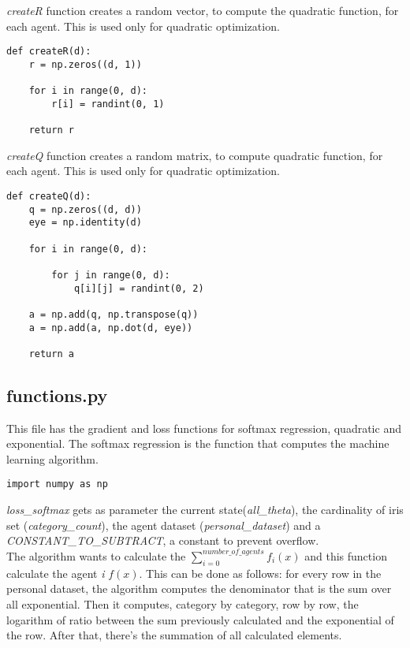 \documentclass[a4paper,11pt,oneside]{book}
\begin{document}
\textit{createR} function creates a random vector, to compute the quadratic function, for each agent. This is used only for quadratic optimization.

\begin{lstlisting}
def createR(d):
    r = np.zeros((d, 1))

    for i in range(0, d):
        r[i] = randint(0, 1)

    return r
\end{lstlisting}

\textit{createQ} function creates a random matrix, to compute quadratic function, for each agent. This is used only for quadratic optimization.

\begin{lstlisting}
def createQ(d):
    q = np.zeros((d, d))
    eye = np.identity(d)

    for i in range(0, d):

        for j in range(0, d):
            q[i][j] = randint(0, 2)

    a = np.add(q, np.transpose(q))
    a = np.add(a, np.dot(d, eye))

    return a
\end{lstlisting}

\subsection{functions.py}

This file has the gradient and loss functions for softmax regression, quadratic and exponential. The softmax regression is the  function
that computes the machine learning algorithm.

\begin{lstlisting}
import numpy as np
\end{lstlisting}

\textit{loss\_softmax} gets as parameter the current state(\textit{all\_theta}), the cardinality of iris set (\textit{category\_count}), the agent
dataset (\textit{personal\_dataset}) and a \textit{CONSTANT\_TO\_SUBTRACT}, a constant to prevent overflow.\\
The algorithm wants to calculate the $\displaystyle\sum_{i=0}^{number\_of\_agents} f_{i}(x)$ and this function calculate the agent \textit{i}
$f(x)$. This can be done as follows: for every row in the personal dataset, the algorithm computes the denominator that is the sum over all
exponential. Then it computes, category by category, row by row, the logarithm of ratio between the sum previously calculated and the exponential of the row.
After that, there's the summation of all calculated elements.
\end{document}
